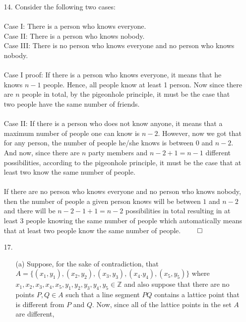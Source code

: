 \documentclass[12pt, a4paper]{article}
\newcommand{\ints}{\mathbb{Z}}
\begin{document}
\begin{itemize}
\item[]

\item[14.]
Consider the following two cases:\\\\
Case I: There is a person who knows everyone.\\
Case II: There is a person who knows nobody.\\
Case III: There is no person who knows everyone and no person who knows nobody.
\\\\
Case I proof: If there is a person who knows everyone, it means that he knows $n - 1$ people. Hence, all people know at least 1 person. Now since there are $n$ people in total, by the pigeonhole principle, it must be the case that two people have the same number of friends. \\\\
Case II: If there is a person who does not know anyone, it means that a maximum number of people one can know is $n - 2$. However, now we got that for any person, the number of people he/she knows is between
0 and $n - 2$. And now, since there are $n$ party members and $n - 2 + 1 = n - 1$ different possibilities, according to the pigeonhole principle, it must be the case that at least two know the same number of people.
\\\\
If there are no person who knows everyone and no person who knows nobody, then the number of people a given person knows will be between $1$ and $n - 2$ and there will be $n - 2 - 1 + 1 = n - 2$ possibilities in total
resulting in at least 3 people knowing the same number of people which automatically means that at least two people know the same number of people.
$\qed$

\item[]

\item[17.]
\begin{itemize}
\item[(a)]
Suppose, for the sake of contradiction, that $A = \{(x_1, y_1), (x_2, y_2), (x_3, y_3), (x_4. y_4), (x_5, y_5)\}$ where $x_1, x_2, x_3, x_4, x_5, y_1, y_2, y_3, y_4, y_5 \in \ints$
and also suppose that there are no points $P, Q \in A$ such that a line segment $PQ$ contains a lattice point that is different from $P$ and $Q$.
Now, since all of the lattice points in the set $A$ are different, 
\end{itemize}


\end{itemize}
\end{document}
